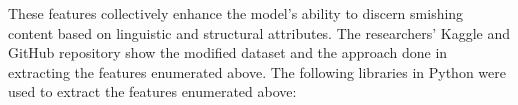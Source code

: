 \documentclass[conference]{IEEEtran}
\begin{document}
    

These features collectively enhance the model's ability to discern smishing content based on linguistic and structural attributes. The researchers' Kaggle and GitHub repository show the modified dataset and the approach done in extracting the features enumerated above. The following libraries in Python were used to extract the features enumerated above:
\end{document}

